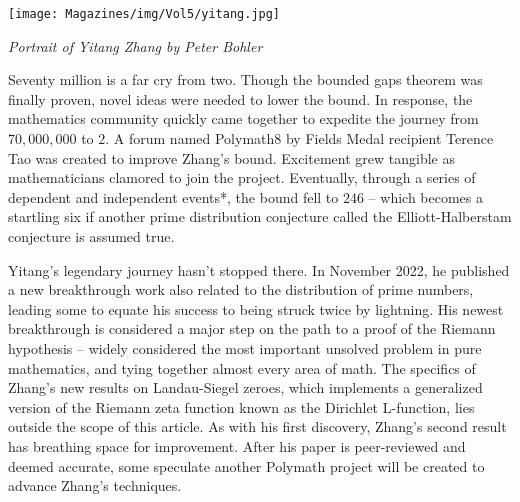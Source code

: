 \documentclass{article}
\begin{document}
\begin{center}
    \footnotesize
    \texttt{[image: Magazines/img/Vol5/yitang.jpg]}
    
    \textit{Portrait of Yitang Zhang by Peter Bohler}
\end{center}

Seventy million is a far cry from two. Though the bounded gaps theorem was finally proven, novel ideas were needed to lower the bound. In response, the mathematics community quickly came together to expedite the journey from $70,000,000$ to $2$. A forum named Polymath8 by Fields Medal recipient Terence Tao was created to improve Zhang’s bound. Excitement grew tangible as mathematicians clamored to join the project. Eventually, through a series of dependent and independent events*, the bound fell to $246$ – which becomes a startling six if another prime distribution conjecture called the Elliott-Halberstam conjecture is assumed true. 

Yitang’s legendary journey hasn’t stopped there. In November 2022, he published a new breakthrough work also related to the distribution of prime numbers, leading some to equate his success to being struck twice by lightning. His newest breakthrough is considered a major step on the path to a proof of the Riemann hypothesis – widely considered the most important unsolved problem in pure mathematics, and tying together almost every area of math. The specifics of Zhang’s new results on Landau-Siegel zeroes, which implements a generalized version of the Riemann zeta function known as the Dirichlet L-function, lies outside the scope of this article. As with his first discovery, Zhang’s second result has breathing space for improvement. After his paper is peer-reviewed and deemed accurate, some speculate another Polymath project will be created to advance Zhang’s techniques.
\end{document}
